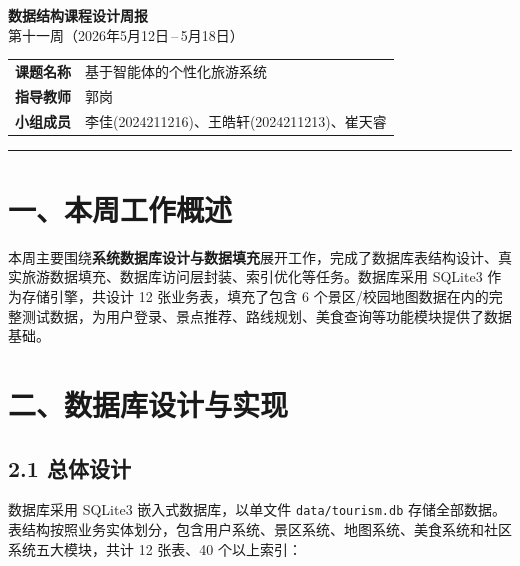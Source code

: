 \documentclass[12pt,a4paper]{article}
\begin{document}
\begin{center}
    {\LARGE\bfseries\color{headblue} 数据结构课程设计周报}\\[6pt]
    {\Large 第十一周（2026年5月12日\,--\,5月18日）}\\[12pt]
    \begin{tabular}{ll}
        \bfseries 课题名称 & 基于智能体的个性化旅游系统 \\
        \bfseries 指导教师 & 郭岗 \\
        \bfseries 小组成员 & 李佳(2024211216)、王皓轩(2024211213)、崔天睿 \\
    \end{tabular}
\end{center}

\rule{\textwidth}{0.8pt}

\section*{一、本周工作概述}

本周主要围绕\textbf{系统数据库设计与数据填充}展开工作，完成了数据库表结构设计、真实旅游数据填充、数据库访问层封装、索引优化等任务。数据库采用 SQLite3 作为存储引擎，共设计 12 张业务表，填充了包含 6 个景区/校园地图数据在内的完整测试数据，为用户登录、景点推荐、路线规划、美食查询等功能模块提供了数据基础。

\section*{二、数据库设计与实现}

\subsection*{2.1 总体设计}

数据库采用 SQLite3 嵌入式数据库，以单文件 \texttt{data/tourism.db} 存储全部数据。表结构按照业务实体划分，包含用户系统、景区系统、地图系统、美食系统和社区系统五大模块，共计 12 张表、40 个以上索引：
\end{document}

